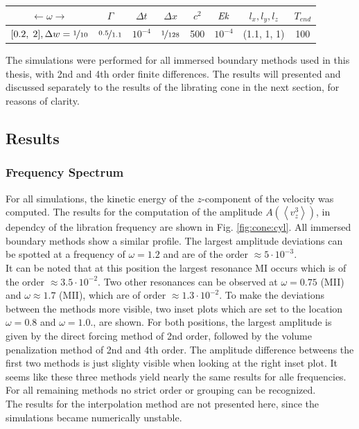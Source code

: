 \begin{center}
\vspace*{0.7ex}
\begin{tabular}{c|c|c|c|c|c|c|c }
 $\leftarrow  \omega \rightarrow $ & $\Gamma$ & $\Delta t$ & $\Delta x$ & $c^2$ & $\mbox{\textit{Ek}}$  & $l_x, l_y, l_z$ & $T_{end}$\\
\hline
 $[0.2,\; 2], \Delta w = \nicefrac{1}{10}$ & $\nicefrac{0.5}{1.1}$ & $10^{-4}$ & $\nicefrac{1}{128}$ & 500 & $10^{-4}$  & (1.1, 1, 1) & 100\\
\end{tabular}
\vspace*{0.7ex}
\end{center}

The simulations were performed for all immersed boundary methods used in this thesis, with 2nd and 4th order finite differences.
The results will presented and discussed separately to the results of the librating cone in the next section, for reasons of clarity.

\clearpage


\subsection{Results}
\subsubsection{Frequency Spectrum}

For all simulations, the kinetic energy of the $z$-component of the velocity was computed.
The results for the computation of the amplitude $A\left(\left<v_z^3\right>\right)$, in dependcy of the libration
frequency are shown in Fig. \ref{fig:cone:cyl}.
All immersed boundary methods show a similar profile.
The largest amplitude deviations can be spotted at a frequency of $\omega=1.2$ and are of the order $\approx5\cdot10^{-3}$.\\
It can be noted that at this position the largest resonance M\RN{1} occurs which is of the order $\approx3.5\cdot10^{-2}$.
Two other resonances can be observed at $\omega=0.75$ (M\RN{2}) and $\omega\approx1.7$ (M\RN{2}), which are
of order ${\approx1.3\cdot10^{-2}}$.
To make the deviations between the methods more visible, two inset plots which are
set to the location $\omega=0.8$ and $\omega=1.0$., are shown.
For both positions, the largest amplitude is given by the direct forcing method of 2nd order, followed by
the volume penalization method of 2nd and 4th order.
The amplitude difference betweens the first two methods is just slighty visible when looking at the right inset plot.
It seems like these three methods yield nearly the same results for alle frequencies.
For all remaining methods  no strict order or grouping can be recognized.\\
The results for the interpolation method are not presented here, since the simulations became numerically unstable.

